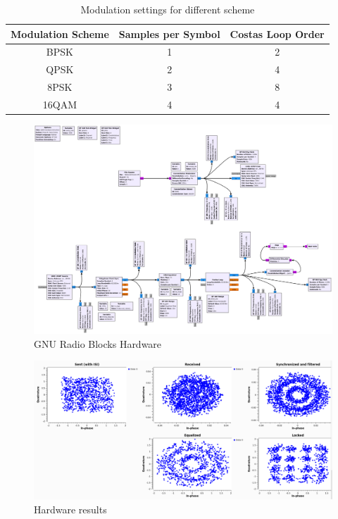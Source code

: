 \begin{table}[]
	\centering
	\caption{Modulation settings for different scheme}
	\begin{tabular}{ccc}
		\toprule
		Modulation Scheme & Samples per Symbol & Costas Loop Order\\
		\midrule
		BPSK  & 1 & 2 \\
		QPSK  & 2 & 4 \\
		8PSK  & 3 & 8 \\
		16QAM & 4 & 4 \\
		\bottomrule
	\end{tabular}
	\label{tab:modulation_settings}
\end{table}

\begin{figure}
	\includegraphics[width=\linewidth]{./figures/pdfs/qam_Hardware_1711.pdf}
	\caption{GNU Radio Blocks Hardware}
	\label{fig:simul16QAM_Hardware_Aufbau}	
\end{figure}

\begin{figure}
	\includegraphics[width=\linewidth]{./figures/screenshots/QAM16_Hardware_1711.png}
	\caption{Hardware results}
	\label{fig:simul16QAM__Hardware}	
\end{figure}

